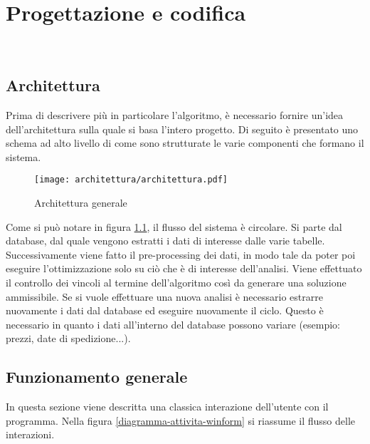 
\chapter{Progettazione e codifica}
\label{cap:progettazione-codifica}

\noindent {}\\

\section{Architettura}
\label{sec:progettazione}
\noindent Prima di descrivere più in particolare l'algoritmo, è necessario
fornire un’idea dell’architettura sulla quale si basa l'intero progetto.
Di seguito è presentato uno schema ad alto livello di come sono strutturate le varie
componenti che formano il sistema.

\begin{figure}[!h] 
    \centering 
    \texttt{[image: architettura/architettura.pdf]} 
    \caption{Architettura generale}
    \label{architettura-generale}
\end{figure}

\noindent Come si può notare in figura \ref{architettura-generale},
il flusso del sistema è circolare.
Si parte dal database, dal quale vengono estratti i dati di interesse dalle varie
tabelle. Successivamente viene fatto il pre-processing dei dati,
in modo tale da poter poi eseguire l'ottimizzazione solo su
ciò che è di interesse dell'analisi.
Viene effettuato il controllo dei vincoli al termine
dell'algoritmo così da generare
una soluzione ammissibile. Se si vuole effettuare una nuova
analisi è necessario estrarre nuovamente i dati dal
database ed eseguire nuovamente il ciclo. Questo è necessario
in quanto i dati all'interno del database possono variare
(esempio: prezzi, date di spedizione...).

\newpage


\section{Funzionamento generale}
In questa sezione viene descritta una classica interazione dell'utente con il programma.
Nella figura \ref{diagramma-attivita-winform} si riassume il flusso delle interazioni.

